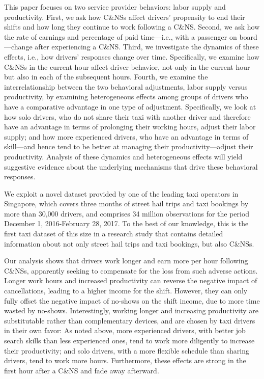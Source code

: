 \documentclass[reviewmode]{AEA}
\begin{document}
This paper focuses on two service provider behaviors: labor supply and productivity. First, we ask how C\&NSs affect drivers' propensity to end their shifts and how long they continue to work following a C\&NS.  Second, we ask how the rate of earnings and percentage of paid time---i.e., with a passenger on board---change after experiencing a C\&NS. Third, we investigate the dynamics of these effects, i.e., how drivers' responses change over time. Specifically, we examine how C\&NSs in the current hour affect driver behavior, not only in the current hour but also in  each of the subsequent hours. Fourth, we examine the interrelationship between the two behavioral adjustments, labor supply versus productivity, by examining heterogeneous effects among groups of drivers who have a comparative advantage in one type of adjustment. Specifically, we look at how solo drivers, who do not share their taxi with another driver and therefore have an advantage in terms of prolonging their working hours, adjust their labor supply; and how more experienced drivers, who have an advantage in terms of skill---and hence tend to be better at managing their productivity---adjust their  productivity. Analysis of these dynamics and heterogeneous effects will yield suggestive evidence about the underlying mechanisms that drive these behavioral responses.

We exploit a novel dataset provided by one of the leading taxi operators in Singapore, which covers three months of street hail trips and taxi bookings by more than 30,000 drivers, and comprises 34 million observations for the period December 1, 2016-February 28, 2017. To the best of our knowledge, this is the first taxi dataset of this size in a research study that contains detailed information about not only street hail trips and taxi bookings, but also C\&NSs.

Our analysis shows that drivers work longer and earn more per hour following C\&NSs, apparently seeking to compensate for the loss from such adverse actions. Longer work hours and increased productivity can reverse the negative impact of cancellations, leading to a higher income for the shift. However, they can only fully offset the negative impact of no-shows on the shift income, due to more time wasted by no-shows. Interestingly, working longer and increasing productivity are substitutable rather than complementary devices, and are chosen by taxi drivers in their own favor: As noted above, more experienced drivers, with better job search skills than less experienced ones, tend to work more diligently to increase their productivity; and solo drivers, with a more flexible schedule than sharing drivers, tend to work more hours. Furthermore, these effects are strong in the first hour after a C\&NS and fade away afterward. 
\end{document}

